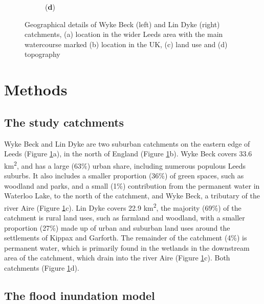 \documentclass[APA,Times2COL]{WileyNJDv5}
\begin{document}
\begin{figure}[htbp!]
\begin{subfigure}[b]{.3\textwidth}
{  \parbox[b]{2.2in}{(\textbf{d})\\\rule{0ex}{1.5in}}}
\end{subfigure}
\caption{Geographical details of Wyke Beck (left) and Lin Dyke (right) catchments, (a) location in the wider Leeds area with the main watercourse marked (b) location in the UK, (c) land use and (d) topography} \label{fig:catchments}
\end{figure}


\section{Methods}\label{sec:methods}
\subsection{The study catchments}\label{subsec:model:catchments}
Wyke Beck and Lin Dyke are two suburban catchments on the eastern edge of Leeds (Figure \ref{fig:catchments}a), in the north of England (Figure \ref{fig:catchments}b). Wyke Beck covers 33.6 km\textsuperscript{2}, and has a large (63\%) urban share, including numerous populous Leeds suburbs. It also includes a smaller proportion (36\%) of green spaces, such as woodland and parks, and a small (1\%) contribution from the permanent water in Waterloo Lake, to the north of the catchment, and Wyke Beck, a tributary of the river Aire (Figure \ref{fig:catchments}c). Lin Dyke covers 22.9 km\textsuperscript{2}, the majority (69\%) of the catchment is rural land uses, such as farmland and woodland, with a smaller proportion (27\%) made up of urban and suburban land uses around the settlements of Kippax and Garforth. The remainder of the catchment (4\%) is permanent water, which is primarily found in the wetlands in the downstream area of the catchment, which drain into the river Aire (Figure \ref{fig:catchments}c). Both catchments  (Figure \ref{fig:catchments}d). 

\subsection{The flood inundation model}\label{subsec:model:catchments}
\end{document}
